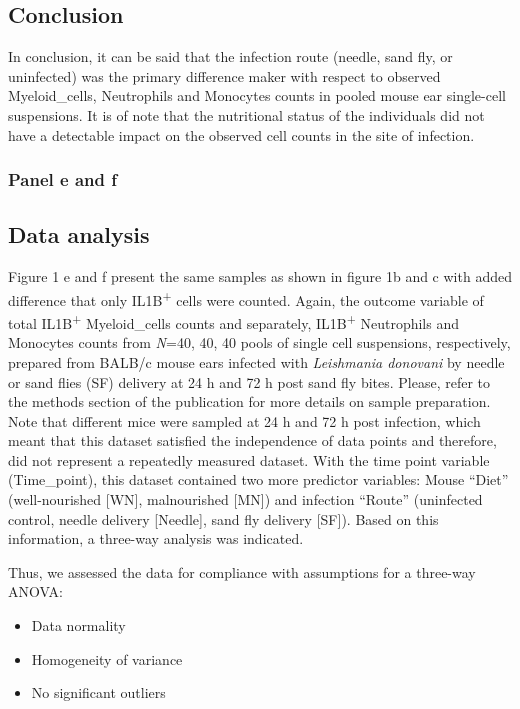 \documentclass[
  12pt,
  letterpaper,
]{article}
\providecommand{\tightlist}{%
  \setlength{\itemsep}{0pt}\setlength{\parskip}{0pt}}
\begin{document}
\subsection{Conclusion}\label{conclusion}

In conclusion, it can be said that the infection route (needle, sand fly, or uninfected) was the primary difference maker with respect to observed Myeloid\_cells, Neutrophils and Monocytes counts in pooled mouse ear single-cell suspensions. It is of note that the nutritional status of the individuals did not have a detectable impact on the observed cell counts in the site of infection.

\subsubsection{Panel e and f}\label{panel-e-and-f}

\subsection{Data analysis}\label{data-analysis-1}

Figure 1 e and f present the same samples as shown in figure 1b and c with added difference that only IL1B\textsuperscript{+} cells were counted. Again, the outcome variable of total IL1B\textsuperscript{+} Myeloid\_cells counts and separately, IL1B\textsuperscript{+} Neutrophils and Monocytes counts from \emph{N}=40, 40, 40 pools of single cell suspensions, respectively, prepared from BALB/c mouse ears infected with \emph{Leishmania donovani} by needle or sand flies (SF) delivery at 24 h and 72 h post sand fly bites. Please, refer to the methods section of the publication for more details on sample preparation. Note that different mice were sampled at 24 h and 72 h post infection, which meant that this dataset satisfied the independence of data points and therefore, did not represent a repeatedly measured dataset. With the time point variable (Time\_point), this dataset contained two more predictor variables: Mouse ``Diet'' (well-nourished {[}WN{]}, malnourished {[}MN{]}) and infection ``Route'' (uninfected control, needle delivery {[}Needle{]}, sand fly delivery {[}SF{]}). Based on this information, a three-way analysis was indicated.

Thus, we assessed the data for compliance with assumptions for a three-way ANOVA:

\begin{itemize}
\tightlist
\item
  Data normality
\item
  Homogeneity of variance
\item
  No significant outliers
\end{itemize}
\end{document}
